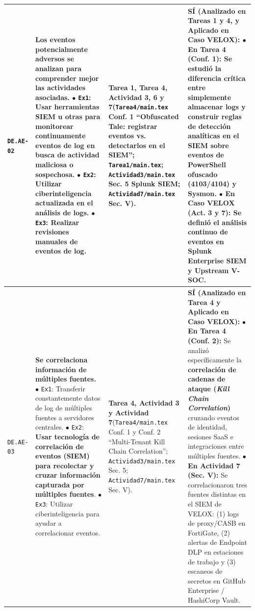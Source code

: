 \documentclass[letterpaper,11pt]{article}
\begin{document}
\begin{longtable}{|C{1.5cm}|L{5.3cm}|L{4.3cm}|L{5.8cm}|}
\texttt{DE.AE-02} &
\textbf{Los eventos potencialmente adversos se analizan para comprender mejor las actividades asociadas.}\newline
$\bullet$ \texttt{Ex1}: \textbf{Usar herramientas SIEM u otras para monitorear continuamente eventos de log en busca de actividad maliciosa o sospechosa}.\newline
$\bullet$ \texttt{Ex2}: Utilizar ciberinteligencia actualizada en el análisis de logs.\newline
$\bullet$ \texttt{Ex3}: Realizar revisiones manuales de eventos de log. &
\textbf{Tarea 1, Tarea 4, Actividad 3, 6 y 7}\newline (\texttt{Tarea4/main.tex} Conf. 1 ``Obfuscated Tale: registrar eventos vs. detectarlos en el SIEM''; \texttt{Tarea1/main.tex}; \texttt{Actividad3/main.tex} Sec. 5 Splunk SIEM; \texttt{Actividad7/main.tex} Sec. V). &
\textbf{SÍ (Analizado en Tareas 1 y 4, y Aplicado en Caso VELOX):}\newline
$\bullet$ \textbf{En Tarea 4 (Conf. 1):} Se estudió la diferencia crítica entre simplemente almacenar logs y construir reglas de detección analíticas en el \textbf{SIEM} sobre eventos de PowerShell ofuscado (4103/4104) y Sysmon.\newline
$\bullet$ \textbf{En Caso VELOX (Act. 3 y 7):} Se definió el análisis continuo de eventos en \textbf{Splunk Enterprise SIEM} y \textbf{Upstream V-SOC}. \\
\hline

\texttt{DE.AE-03} &
\textbf{Se correlaciona información de múltiples fuentes.}\newline
$\bullet$ \texttt{Ex1}: Transferir constantemente datos de log de múltiples fuentes a servidores centrales.\newline
$\bullet$ \texttt{Ex2}: \textbf{Usar tecnología de correlación de eventos (SIEM) para recolectar y cruzar información capturada por múltiples fuentes}.\newline
$\bullet$ \texttt{Ex3}: Utilizar ciberinteligencia para ayudar a correlacionar eventos. &
\textbf{Tarea 4, Actividad 3 y Actividad 7}\newline (\texttt{Tarea4/main.tex} Conf. 1 y Conf. 2 ``Multi-Tenant Kill Chain Correlation''; \texttt{Actividad3/main.tex} Sec. 5; \texttt{Actividad7/main.tex} Sec. V). &
\textbf{SÍ (Analizado en Tarea 4 y Aplicado en Caso VELOX):}\newline
$\bullet$ \textbf{En Tarea 4 (Conf. 2):} Se analizó específicamente la \textbf{correlación de cadenas de ataque (\textit{Kill Chain Correlation})} cruzando eventos de identidad, sesiones SaaS e integraciones entre múltiples fuentes.\newline
$\bullet$ \textbf{En Actividad 7 (Sec. V):} Se correlacionaron tres fuentes distintas en el SIEM de VELOX: (1) logs de proxy/CASB en FortiGate, (2) alertas de Endpoint DLP en estaciones de trabajo y (3) escaneos de secretos en GitHub Enterprise / HashiCorp Vault. \\
\hline


\end{longtable}
\end{document}

